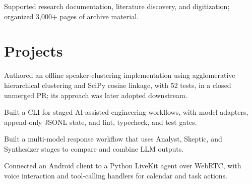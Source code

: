 \documentclass{../../templates/1/resume}
\begin{document}
\begin{resumeitemize}
\item Supported research documentation, literature discovery, and digitization; organized 3,000+ pages of archive material.
\end{resumeitemize}

\section{Projects}

\begin{resumeitemize}
\item Authored an offline speaker-clustering implementation using agglomerative hierarchical clustering and SciPy cosine linkage, with 52 tests, in a closed unmerged PR; its approach was later adopted downstream.
\end{resumeitemize}

\begin{resumeitemize}
\item Built a CLI for staged AI-assisted engineering workflows, with model adapters, append-only JSONL state, and lint, typecheck, and test gates.
\end{resumeitemize}

\begin{resumeitemize}
\item Built a multi-model response workflow that uses Analyst, Skeptic, and Synthesizer stages to compare and combine LLM outputs.
\end{resumeitemize}

\begin{resumeitemize}
\item Connected an Android client to a Python LiveKit agent over WebRTC, with voice interaction and tool-calling handlers for calendar and task actions.
\end{resumeitemize}
\end{document}
